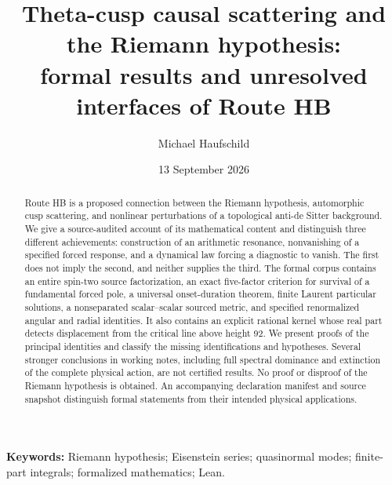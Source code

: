 \documentclass[11pt,a4paper]{article}
\title{Theta-cusp causal scattering and the Riemann hypothesis:\\formal results and unresolved interfaces of Route HB}
\author{Michael Haufschild}
\date{13 September 2026}
\theoremstyle{definition}\newtheorem{definition}[theorem]{Definition}
\theoremstyle{remark}\newtheorem{remark}[theorem]{Remark}
\begin{document}
\maketitle
\begin{abstract}
Route HB is a proposed connection between the Riemann hypothesis, automorphic cusp scattering, and nonlinear perturbations of a topological anti-de Sitter background. We give a source-audited account of its mathematical content and distinguish three different achievements: construction of an arithmetic resonance, nonvanishing of a specified forced response, and a dynamical law forcing a diagnostic to vanish. The first does not imply the second, and neither supplies the third. The formal corpus contains an entire spin-two source factorization, an exact five-factor criterion for survival of a fundamental forced pole, a universal onset-duration theorem, finite Laurent particular solutions, a nonseparated scalar--scalar sourced metric, and specified renormalized angular and radial identities. It also contains an explicit rational kernel whose real part detects displacement from the critical line above height 92. We present proofs of the principal identities and classify the missing identifications and hypotheses. Several stronger conclusions in working notes, including full spectral dominance and extinction of the complete physical action, are not certified results. No proof or disproof of the Riemann hypothesis is obtained. An accompanying declaration manifest and source snapshot distinguish formal statements from their intended physical applications.
\end{abstract}
\noindent\textbf{Keywords:} Riemann hypothesis; Eisenstein series; quasinormal modes; finite-part integrals; formalized mathematics; Lean.
\tableofcontents





\appendix



\end{document}
